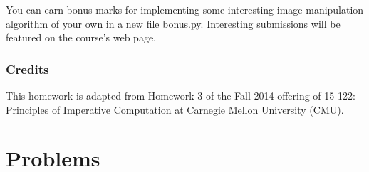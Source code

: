 \documentclass[addpoints]{exam}
\begin{document}
  You can earn bonus marks for implementing some interesting image manipulation algorithm of your own in a new file  \textsf{bonus.py}. Interesting submissions will be featured on the course's web page.

  \section{Credits}

  This homework is adapted from Homework 3 of the Fall 2014 offering of 15-122: Principles of Imperative Computation at Carnegie Mellon University (CMU).


\part{Problems}
\end{document}
